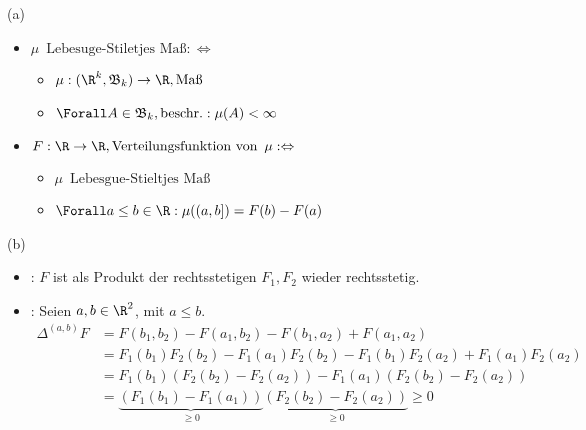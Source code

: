 \begin{solution}

(a)

\begin{itemize}

  \item $\mu \enspace \text{Lebesuge-Stiletjes Maß} : \Leftrightarrow$
  \begin{itemize}
    \item $\mu: (\R^k, \mathfrak{B}_k) \to \R, \text{Maß}$
    \item $\Forall A \in \mathfrak{B}_k, \text{beschr.}: \mu(A) < \infty$
  \end{itemize}

  \item $F: \R \to \R, \text{Verteilungsfunktion von} \enspace \mu : \Leftrightarrow$
  \begin{itemize}
    \item $\mu \enspace \text{Lebesgue-Stieltjes Maß}$
    \item $\Forall a \leq b \in \R: \mu((a, b]) = F(b) - F(a)$
  \end{itemize}

\end{itemize}

(b)

\begin{itemize}

  \item {}: $F$ ist als Produkt der rechtsstetigen $F_1, F_2$ wieder rechtsstetig.

  \item {}: Seien $a, b \in \R^2$, mit $a \leq b$.
  \begin{align*}
    \Delta^{(a, b)} F
    & =
    F(b_1, b_2) - F(a_1, b_2) - F(b_1, a_2) + F(a_1, a_2) \\
    & =
    F_1(b_1) F_2(b_2) -
    F_1(a_1) F_2(b_2) -
    F_1(b_1) F_2(a_2) +
    F_1(a_1) F_2(a_2) \\
    & =
    F_1(b_1) (F_2(b_2) - F_2(a_2)) -
    F_1(a_1) (F_2(b_2) - F_2(a_2)) \\
    & =
    \underbrace{(F_1(b_1) - F_1(a_1))}_{\geq 0}
    \underbrace{(F_2(b_2) - F_2(a_2))}_{\geq 0}
    \geq 0
  \end{align*}

\end{itemize}

\end{solution}
